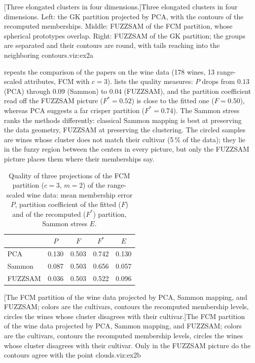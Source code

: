 [Three elongated clusters in four dimensions.]{Three elongated clusters in four dimensions. Left: the GK partition projected by PCA, with the contours of the recomputed memberships. Middle: FUZZSAM of the FCM partition, whose spherical prototypes overlap. Right: FUZZSAM of the GK partition; the groups are separated and their contours are round, with tails reaching into the neighboring contours.}{viz:ex2a}

 repeats the comparison of the papers on the wine data (178 wines, 13 range-scaled attributes, FCM with $c=3$).  lists the quality measures: $P$ drops from $0.13$ (PCA) through $0.09$ (Sammon) to $0.04$ (FUZZSAM), and the partition coefficient read off the FUZZSAM picture ($F^*=0.52$) is close to the fitted one ($F=0.50$), whereas PCA suggests a far crisper partition ($F^*=0.74$). The Sammon stress ranks the methods differently: classical Sammon mapping is best at preserving the data geometry, FUZZSAM at preserving the clustering. The circled samples are wines whose cluster does not match their cultivar (5\,\% of the data); they lie in the fuzzy region between the centers in every picture, but only the FUZZSAM picture places them where their memberships say.

\begin{table}[htbp]\centering\small
\caption{Quality of three projections of the FCM partition ($c=3$, $m=2$) of the range-scaled wine data: mean membership error $P$, partition coefficient of the fitted ($F$) and of the recomputed ($F^*$) partition, Sammon stress $E$.}
\label{tab:viz:wine}
\begin{tabular}{lcccc}\toprule
 & $P$ & $F$ & $F^*$ & $E$ \\\midrule
PCA     & 0.130 & 0.503 & 0.742 & 0.130 \\
Sammon  & 0.087 & 0.503 & 0.656 & 0.057 \\
FUZZSAM & 0.036 & 0.503 & 0.522 & 0.096 \\\bottomrule
\end{tabular}
\end{table}

[The FCM partition of the wine data projected by PCA, Sammon mapping, and FUZZSAM; colors are the cultivars, contours the recomputed membership levels, circles the wines whose cluster disagrees with their cultivar.]{The FCM partition of the wine data projected by PCA, Sammon mapping, and FUZZSAM; colors are the cultivars, contours the recomputed membership levels, circles the wines whose cluster disagrees with their cultivar. Only in the FUZZSAM picture do the contours agree with the point clouds.}{viz:ex2b}

